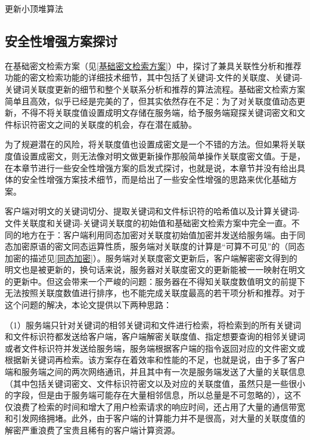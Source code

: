 \documentclass[promaster]{thesis-uestc}
\begin{document}
\begin{algorithm}[H]
    \caption{更新小顶堆算法}
    \label{更新小顶堆算法}
\end{algorithm}

\subsection{安全性增强方案探讨}\label{安全性增强方案}
在基础密文检索方案（见\ref{基础密文检索方案}）中，探讨了兼具关联性分析和推荐功能的密文检索功能的详细技术细节，其中包括了关键词-文件的关联度、关键词-关键词关联度更新的细节和整个关联系分析和推荐的算法流程。基础密文检索方案简单且高效，似乎已经是完美的了，但其实依然存在不足：为了对关联度值动态更新，不得不将关联度值设置成明文存储在服务端，给予服务端窥探关键词密文和文件标识符密文之间的关联度的机会，存在潜在威胁。

为了规避潜在的风险，将关联度值也设置成密文是一个不错的方法。但如果将关联度值设置成密文，则无法像对明文做更新操作那般简单操作关联度密文值。于是，在本章节进行一些安全性增强方案的启发式探讨，也就是说，本章节并没有给出具体的安全性增强方案技术细节，而是给出了一些安全性增强的思路来优化基础方案。

客户端对明文的关键词切分、提取关键词和文件标识符的哈希值以及计算关键词-文件关联度和关键词-关键词关联度的初始值和基础密文检索方案中完全一直。不同的地方在于：客户端利用同态加密对关联度初始值加密并发送给服务端。由于同态加密原语的密文同态运算性质，服务端对关联度的计算是“可算不可见”的（同态加密的描述见\ref{同态加密}）。服务端对关联度密文更新后，客户端解密密文得到的明文也是被更新的，换句话来说，服务器对关联度密文的更新能被一一映射在明文的更新中。但这会带来一个严峻的问题：服务器在不得知关联度数值明文的前提下无法按照关联度数值进行排序，也不能完成关联度最高的若干项分析和推荐。对于这个问题的解决，本论文提供以下两种思路：

（1）服务端只针对关键词的相邻关键词和文件进行检索，将检索到的所有关键词和文件标识符都发送给客户端，客户端解密关联度值、指定想要查询的相邻关键词或者文件标识符并发送给服务端，服务端根据客户端的指令返回对应的文件密文或根据新关键词再检索。该方案存在着效率和性能的不足，也就是说，由于多了客户端和服务端之间的两次网络通讯，并且其中有一次是服务端发送了大量的关联信息（其中包括关键词密文、文件标识符密文以及对应的关联度值，虽然只是一些很小的字段，但是由于服务端可能存在大量相邻信息，所以总量是不可忽略的），这不仅浪费了检索的时间和增大了用户检索请求的响应时间，还占用了大量的通信带宽和引发网络拥堵。此外，由于客户端的计算能力并不是很高，对大量的关联度值的解密严重浪费了宝贵且稀有的客户端计算资源。
\end{document}

